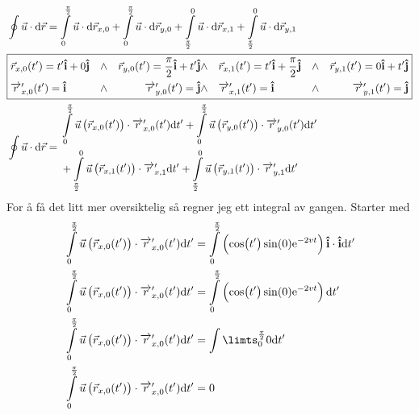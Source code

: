 \documentclass[a4paper,10pt,norsk]{article}
\newcommand{\dd}[1]{\mathrm{d}#1}
\newcommand{\uvec}[1]{\boldsymbol{\hat{\textbf{#1}}}}
\begin{document}
		\begin{align*}
			&\oint \vec{u}  \cdot \dd{\vec{r} } = \int\limits_0^{\frac{\pi}{2}} \vec{u} \cdot \dd{\vec{r}_{x,0} } + \int\limits_0^{\frac{\pi}{2}} \vec{u} \cdot \dd{\vec{r}_{y,0} }+  \int\limits_{\frac{\pi}{2}}^0 \vec{u} \cdot \dd{\vec{r}_{x,1} } + \int\limits_{\frac{\pi}{2}}^0 \vec{u} \cdot  \dd{\vec{r}_{y,1} }\\
			&\boxed{%
				\begin{aligned}
				&\vec{r}_{x,0}(t') = t' \uvec{i} + 0 \uvec{j} &\wedge&  &\vec{r}_{y,0}(t') = \frac{\pi}{2} \uvec{i} + t' \uvec{j} 
				&\wedge&  &\vec{r}_{x,1}(t') = t' \uvec{i} + \frac{\pi}{2}\uvec{j} &\wedge & &\vec{r}_{y,1}(t') = 0 \uvec{i} + t' \uvec{j}\\
				&\overrightarrow{r}'_{x,0}(t') = \uvec{i} &\wedge & &\overrightarrow{r}'_{y,0}(t') = \uvec{j}
				&\wedge & & \overrightarrow{r}'_{x,1}(t') = \uvec{i} &\wedge & & \overrightarrow{r}_{y,1}^{\prime} (t') = \uvec{j}
			\end{aligned}}\\
			&\oint \vec{u}  \cdot \dd{\vec{r} } =  
			\begin{aligned}
				&\int\limits_0^{\frac{\pi}{2}} \vec{u} \left( \vec{r}_{x,0}(t')  \right) \cdot \overrightarrow{r}'_{x,0}(t') \dd{t'} 
				+ \int\limits_0^{\frac{\pi}{2}} \vec{u} \left( \vec{r}_{y,0}(t')  \right) \cdot \overrightarrow{r}'_{y,0}(t') \dd{t'}\\
				&+ \int\limits_{\frac{\pi}{2}}^0 \vec{u} \left( \vec{r}_{x,1}(t') \right) \cdot \overrightarrow{r}'_{x,1} \dd{t'}
				+\int\limits_{\frac{\pi}{2}}^0 \vec{u} \left( \vec{r}_{y,1}(t') \right) \cdot \overrightarrow{r}'_{y,1} \dd{t'}\\
			\end{aligned}
		\end{align*}
		For å få det litt mer oversiktelig så regner jeg ett integral av gangen. Starter med
		\begin{align*}
			&\int\limits_0^{\frac{\pi}{2}} \vec{u} \left( \vec{r}_{x,0}(t')  \right) \cdot \overrightarrow{r}'_{x,0}(t') \dd{t'} = 
			\int\limits_0^{\frac{\pi}{2}} \left( \cos(t')\sin(0) \mathrm{e}^{-2vt}  \right) \uvec{i}\cdot \uvec{i} \dd{t'}\\
			&\int\limits_0^{\frac{\pi}{2}} \vec{u} \left( \vec{r}_{x,0}(t')  \right) \cdot \overrightarrow{r}'_{x,0}(t') \dd{t'} = 
			\int\limits_0^{\frac{\pi}{2}} \left( \cos(t')\sin(0) \mathrm{e}^{-2vt}   \right) \dd{t'}\\
			&\int\limits_0^{\frac{\pi}{2}} \vec{u} \left( \vec{r}_{x,0}(t')  \right) \cdot \overrightarrow{r}'_{x,0}(t') \dd{t'} =
			\int\limts_0^{\frac{\pi}{2}} 0 \dd{t'}\\
			&\int\limits_0^{\frac{\pi}{2}} \vec{u} \left( \vec{r}_{x,0}(t')  \right) \cdot \overrightarrow{r}'_{x,0}(t') \dd{t'} = 0
		\end{align*}
\end{document}
